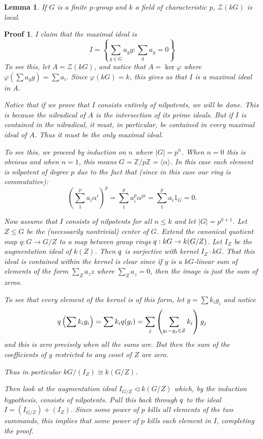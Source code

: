 \documentclass[12pt]{article}
\theoremstyle{nonumberbreak}
\theoremstyle{changebreak}
\newtheorem{lem}[thm]{Lemma}
\theoremstyle{nonumberplain}
\newtheorem{prf}{Proof}
\theoremstyle{change}
\newcommand*{\bbZ}{\mathbb{Z}}
\let\tilde\relax
\newcommand*{\tilde}[1]{\widetilde{#1}}
\begin{document}
\begin{lem}\label{lem-local}
	If $G$ is a finite $p$-group and $k$ a field of characteristic $p$, $\mathcal{Z}(kG)$ is local.
\end{lem}
\begin{prf}
	I claim that the maximal ideal is
	\[I=\left\{\sum_{g\in G}a_gg:\sum_ga_g=0\right\}\]
	To see this, let $A=\mathcal{Z}(kG)$, and notice that $A=\ker\varphi$ where $\varphi(\sum a_g g)=\sum a_i$.
	Since $\varphi(kG)=k$, this gives us that $I$ is a maximal ideal in $A$.

	Notice that if we prove that $I$ consists entirely of nilpotents, we will be done. This is because
	the nilradical of $A$ is the intersection of its prime ideals. But if $I$ is contained in the nilradical, 
	it must, in particular, be contained in every maximal ideal of $A$. Thus it must be the only maximal ideal.

	To see this, we proceed by induction on $n$ where $|G|=p^n$. When $n=0$ this 
	is obvious and when $n=1$, this means $G=\bbZ/p\bbZ=\langle\alpha\rangle$. In this case each element is nilpotent of 
	degree $p$ due to the fact that (since in this case our ring is commutative):
	\[\left(\sum_1^p a_i\alpha^i\right)^p=\sum_1^p a_i^p\alpha^{pi}=\sum_1^p a_i1_G=0.\]

	Now assume that $I$ consists of nilpotents for all $n\le k$ and let $|G|=p^{k+1}$. Let $Z\le G$ be the
	(necessarily nontrivial) center of $G$. Extend the canonical quotient map $q:G\to G/Z$ to a map 
	between group rings $\tilde q:kG\to k(G/Z)$. Let $I_Z$ be the augmentation ideal of $k(Z)$. Then
	$\tilde q$ is surjective with kernel $I_Z\cdot kG$. That this ideal is contained within the kernel is clear
	since if $y$ is a $kG$-linear sum of elements of the form $\sum_Z a_zz$ where $\sum_Z a_z=0$, then
	the image is just the sum of zeros.

	To see that every element of the kernel is of this form, let $y=\sum k_i g_i$ and notice
	\[\tilde q\left(\sum k_ig_i\right)=\sum k_i\tilde q(g_i)=\sum_j\left(\sum_{g_i-g_j\in Z}k_i\right)g_j\]
	and this is zero precisely when all the sums are. But then the sum of the coefficients of $y$ restricted to any coset of $Z$
	are zero. 

	Thus in particular $kG/(I_Z)\cong k(G/Z)$.
	
	Then look at the augmentation ideal $I_{G/Z}\lhd k(G/Z)$ which, by the induction hypothesis, consists of nilpotents.
	Pull this back through $\tilde q$ to the ideal $I=(I_{G/Z})+ (I_Z)$. Since some power of $p$ kills all elements of the two 
	summands, this implies that some power of $p$ kills each element in $I$, completing the proof.
\end{prf}
\end{document}
